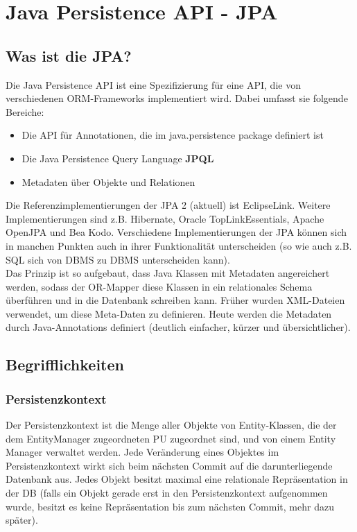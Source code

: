 \section{Java Persistence API - JPA}
\subsection{Was ist die JPA?}
Die Java Persistence API ist eine Spezifizierung für eine API, die von verschiedenen ORM-Frameworks implementiert wird. Dabei umfasst sie folgende Bereiche:
\begin{itemize}
    \item Die API für Annotationen, die im java.persistence package definiert ist
    \item Die Java Persistence Query Language \textbf{JPQL}
    \item Metadaten über Objekte und Relationen
\end{itemize}
Die Referenzimplementierungen der JPA 2 (aktuell) ist EclipseLink. Weitere Implementierungen sind z.B. Hibernate, Oracle TopLinkEssentials, Apache OpenJPA und Bea Kodo. Verschiedene Implementierungen der JPA können sich in manchen Punkten auch in ihrer Funktionalität unterscheiden (so wie auch z.B. SQL sich von DBMS zu DBMS unterscheiden kann).\\
Das Prinzip ist so aufgebaut, dass Java Klassen mit Metadaten angereichert werden, sodass der OR-Mapper diese Klassen in ein relationales Schema überführen und in die Datenbank schreiben kann. Früher wurden XML-Dateien verwendet, um diese Meta-Daten zu definieren. Heute werden die Metadaten durch Java-Annotations definiert (deutlich einfacher, kürzer und übersichtlicher).

\subsection{Begrifflichkeiten}
\subsubsection*{Persistenzkontext}
Der Persistenzkontext ist die Menge aller Objekte von Entity-Klassen, die der dem EntityManager zugeordneten PU zugeordnet sind, und von einem Entity Manager verwaltet werden. Jede Veränderung eines Objektes im Persistenzkontext wirkt sich beim nächsten Commit auf die darunterliegende Datenbank aus. Jedes Objekt besitzt maximal eine relationale Repräsentation in der DB (falls ein Objekt gerade erst in den Persistenzkontext aufgenommen wurde, besitzt es keine Repräsentation bis zum nächsten Commit, mehr dazu später).

